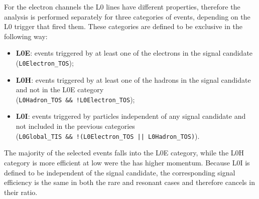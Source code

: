 For the electron channels the L0 lines have different properties, therefore the analysis 
is performed separately for three categories of events, depending on the L0 trigger that fired 
them. These categories are defined to be exclusive in the following way:
%
\begin{itemize}
\item {\bf L0E}: events triggered by at least one of the electrons in the signal candidate (\verb!L0Electron_TOS!);
\item {\bf L0H}: events triggered by at least one of the hadrons in the signal candidate and not in the L0E category \\
 (\verb|L0Hadron_TOS && !L0Electron_TOS|);
\item {\bf L0I}: events triggered by particles independent of any signal candidate and not included in the previous categories\\
(\verb|L0Global_TIS && !(L0Electron_TOS |\verb!|| L0Hadron_TOS)!).
\end{itemize}

The majority of the selected events falls into the L0E category, while
the L0H category is more efficient at low \qsq were the \Kstarz has higher momentum.
Because L0I is defined to be independent of the signal candidate, the corresponding
signal efficiency is the same in both the rare and resonant cases and therefore cancels in their ratio.

